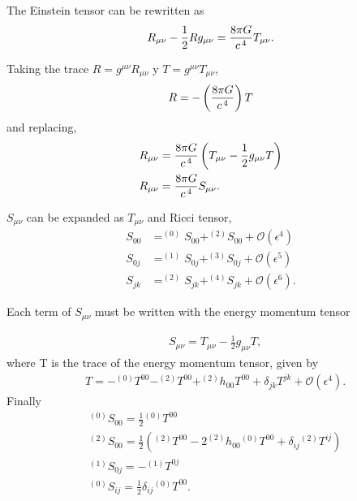 The Einstein tensor can be rewritten as
\begin{align}
R_{\mu\nu} -\frac{1}{2}Rg_{\mu\nu}= \frac{8\pi G}{c^{\hspace{0.05cm}4}}T_{\mu\nu}.
\end{align}

Taking the trace $R = g^{\mu\nu}R_{\mu\nu}$ y $T = g^{\mu\nu}T_{\mu\nu}$,
\begin{align}
R = -\left(\frac{8\pi G}{c^{\hspace{0.05cm}4}}\right)T
\end{align}
and replacing,
\begin{align}
R_{\mu\nu} &= \frac{8\pi G}{c^{\hspace{0.05cm}4}}\left(T_{\mu\nu}-\frac{1}{2}g_{\mu\nu}T\right)\\
R_{\mu\nu} &= \frac{8\pi G}{c^{\hspace{0.05cm}4}}S_{\mu\nu}.
\end{align}

$S_{\mu\nu}$ can be expanded as $T_{\mu\nu}$ and Ricci tensor,
\begin{subequations}
	\begin{align}
S_{00} &= ^{(0)}S_{00}+^{(2)}S_{00}+\mathcal{O}(\epsilon^4)\\
S_{0j} &= ^{(1)}S_{0j}+^{(3)}S_{0j}+\mathcal{O}(\epsilon^5)\\
S_{jk} &= ^{(2)}S_{jk}+^{(4)}S_{jk}+\mathcal{O}(\epsilon^6).
\end{align}
\end{subequations}

Each term of $S_{\mu\nu}$ must be written with the energy momentum tensor

\begin{align}
\label{eq: Smntensor}
&S_{\mu\nu}=T_{\mu\nu}-\frac{1}{2}g_{\mu\nu}T,
\end{align}
where T is the trace of the energy momentum tensor, given by
\begin{align}
&T= -^{(0)}T^{00} - ^{(2)}T^{00}+^{(2)}h_{00}T^{00}+\delta_{jk}T^{jk}+\mathcal{O}(\epsilon^4).
\end{align}
Finally
\begin{subequations}
\begin{align}
\label{eq: SintermsofT}
&^{(0)}S_{00} = \frac{1}{2}{}^{(0)}T^{00}\\
&^{(2)}S_{00}= \frac{1}{2}\left(^{(2)}T^{00}-2^{(2)}h_{00}{}^{(0)}T^{00}+\delta_{ij}{}^{(2)}T^{ij}\right)\\
&^{(1)}S_{0j}= -{}^{(1)}T^{0j}\\
&^{(0)}S_{ij}= \frac{1}{2}\delta_{ij}{}^{(0)}T^{00}.
\end{align}
\end{subequations}


